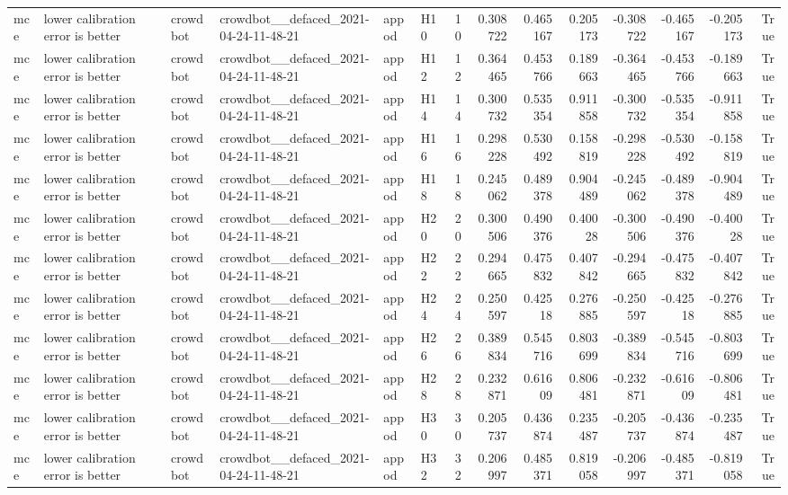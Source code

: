 \begin{longtable}{llllllrrrrrrrr}
mce & lower calibration error is better & crowdbot & crowdbot\_\_defaced\_2021-04-24-11-48-21 & appod & H10 & 10 & 0.308722 & 0.465167 & 0.205173 & -0.308722 & -0.465167 & -0.205173 & True \\
mce & lower calibration error is better & crowdbot & crowdbot\_\_defaced\_2021-04-24-11-48-21 & appod & H12 & 12 & 0.364465 & 0.453766 & 0.189663 & -0.364465 & -0.453766 & -0.189663 & True \\
mce & lower calibration error is better & crowdbot & crowdbot\_\_defaced\_2021-04-24-11-48-21 & appod & H14 & 14 & 0.300732 & 0.535354 & 0.911858 & -0.300732 & -0.535354 & -0.911858 & True \\
mce & lower calibration error is better & crowdbot & crowdbot\_\_defaced\_2021-04-24-11-48-21 & appod & H16 & 16 & 0.298228 & 0.530492 & 0.158819 & -0.298228 & -0.530492 & -0.158819 & True \\
mce & lower calibration error is better & crowdbot & crowdbot\_\_defaced\_2021-04-24-11-48-21 & appod & H18 & 18 & 0.245062 & 0.489378 & 0.904489 & -0.245062 & -0.489378 & -0.904489 & True \\
mce & lower calibration error is better & crowdbot & crowdbot\_\_defaced\_2021-04-24-11-48-21 & appod & H20 & 20 & 0.300506 & 0.490376 & 0.40028 & -0.300506 & -0.490376 & -0.40028 & True \\
mce & lower calibration error is better & crowdbot & crowdbot\_\_defaced\_2021-04-24-11-48-21 & appod & H22 & 22 & 0.294665 & 0.475832 & 0.407842 & -0.294665 & -0.475832 & -0.407842 & True \\
mce & lower calibration error is better & crowdbot & crowdbot\_\_defaced\_2021-04-24-11-48-21 & appod & H24 & 24 & 0.250597 & 0.42518 & 0.276885 & -0.250597 & -0.42518 & -0.276885 & True \\
mce & lower calibration error is better & crowdbot & crowdbot\_\_defaced\_2021-04-24-11-48-21 & appod & H26 & 26 & 0.389834 & 0.545716 & 0.803699 & -0.389834 & -0.545716 & -0.803699 & True \\
mce & lower calibration error is better & crowdbot & crowdbot\_\_defaced\_2021-04-24-11-48-21 & appod & H28 & 28 & 0.232871 & 0.61609 & 0.806481 & -0.232871 & -0.61609 & -0.806481 & True \\
mce & lower calibration error is better & crowdbot & crowdbot\_\_defaced\_2021-04-24-11-48-21 & appod & H30 & 30 & 0.205737 & 0.436874 & 0.235487 & -0.205737 & -0.436874 & -0.235487 & True \\
mce & lower calibration error is better & crowdbot & crowdbot\_\_defaced\_2021-04-24-11-48-21 & appod & H32 & 32 & 0.206997 & 0.485371 & 0.819058 & -0.206997 & -0.485371 & -0.819058 & True \\

\end{longtable}
